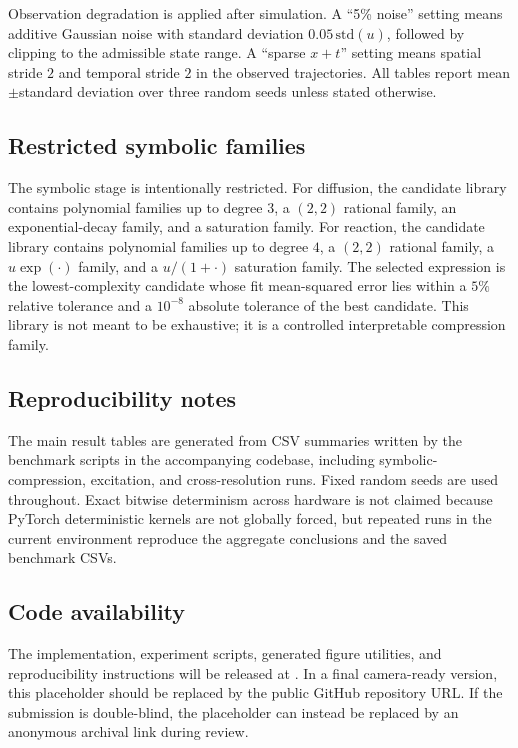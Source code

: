 Observation degradation is applied after simulation. A ``5\% noise'' setting means additive Gaussian noise with standard deviation $0.05\,\mathrm{std}(u)$, followed by clipping to the admissible state range. A ``sparse $x+t$'' setting means spatial stride $2$ and temporal stride $2$ in the observed trajectories. All tables report mean$\pm$standard deviation over three random seeds unless stated otherwise.

\subsection{Restricted symbolic families}

The symbolic stage is intentionally restricted. For diffusion, the candidate library contains polynomial families up to degree $3$, a $(2,2)$ rational family, an exponential-decay family, and a saturation family. For reaction, the candidate library contains polynomial families up to degree $4$, a $(2,2)$ rational family, a $u\exp(\cdot)$ family, and a $u/(1+\cdot)$ saturation family. The selected expression is the lowest-complexity candidate whose fit mean-squared error lies within a $5\%$ relative tolerance and a $10^{-8}$ absolute tolerance of the best candidate. This library is not meant to be exhaustive; it is a controlled interpretable compression family.

\subsection{Reproducibility notes}

The main result tables are generated from CSV summaries written by the benchmark scripts in the accompanying codebase, including symbolic-compression, excitation, and cross-resolution runs. Fixed random seeds are used throughout. Exact bitwise determinism across hardware is not claimed because PyTorch deterministic kernels are not globally forced, but repeated runs in the current environment reproduce the aggregate conclusions and the saved benchmark CSVs.

\subsection{Code availability}

The implementation, experiment scripts, generated figure utilities, and reproducibility instructions will be released at \codeurl. In a final camera-ready version, this placeholder should be replaced by the public GitHub repository URL. If the submission is double-blind, the placeholder can instead be replaced by an anonymous archival link during review.
